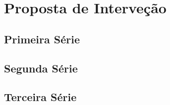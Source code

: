 \chapter{Proposta de Interveção}
\label{cap: docCompartilhada}
\section{Primeira Série}
\section{Segunda Série}
\section{Terceira Série}